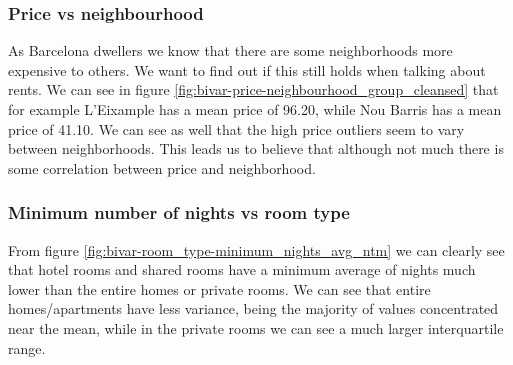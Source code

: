 \pagebreak

\subsubsection{Price vs neighbourhood}


As Barcelona dwellers we know that there are some neighborhoods more expensive
to others. We want to find out if this still holds when talking about \airbnb
rents.  We can see in figure \cref{fig:bivar-price-neighbourhood_group_cleansed}
that for example L'Eixample has a mean price of 96.20, %
while Nou Barris has a mean price of 41.10.  %
We can see as well that the high price outliers seem to vary between
neighborhoods. This leads us to believe that although not much there is some
correlation between price and neighborhood.

\pagebreak

\subsubsection{Minimum number of nights vs room type}


From figure \cref{fig:bivar-room_type-minimum_nights_avg_ntm} we can clearly see
that hotel rooms and shared rooms have a minimum average of nights much lower
than the entire homes or private rooms.  We can see that entire homes/apartments
have less variance, being the majority of values concentrated near the mean,
while in the private rooms we can see a much larger interquartile range.



